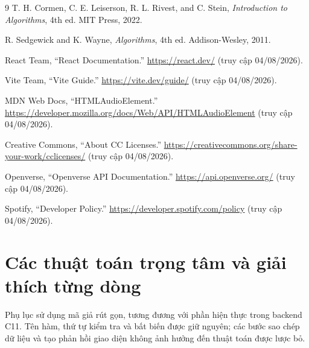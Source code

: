 \documentclass[12pt,a4paper,twoside,openright]{report}
\newcommand{\pagelead}[1]{\noindent\textcolor{hbmuted}{\small #1}}
\begin{document}
\cleardoublepage
{}
{}
{\small
\begin{thebibliography}{9}
T. H. Cormen, C. E. Leiserson, R. L. Rivest, and C. Stein,
\textit{Introduction to Algorithms}, 4th ed. MIT Press, 2022.

R. Sedgewick and K. Wayne, \textit{Algorithms}, 4th ed. Addison-Wesley, 2011.

React Team, ``React Documentation.'' \url{https://react.dev/} (truy cập 04/08/2026).

Vite Team, ``Vite Guide.'' \url{https://vite.dev/guide/} (truy cập 04/08/2026).

MDN Web Docs, ``HTMLAudioElement.''
\url{https://developer.mozilla.org/docs/Web/API/HTMLAudioElement} (truy cập 04/08/2026).

Creative Commons, ``About CC Licenses.''
\url{https://creativecommons.org/share-your-work/cclicenses/} (truy cập 04/08/2026).

Openverse, ``Openverse API Documentation.'' \url{https://api.openverse.org/}
(truy cập 04/08/2026).

Spotify, ``Developer Policy.'' \url{https://developer.spotify.com/policy}
(truy cập 04/08/2026).
\end{thebibliography}
}

\cleardoublepage
\appendix
\chapter{Các thuật toán trọng tâm và giải thích từng dòng}
\pagelead{Phụ lục sử dụng mã giả rút gọn, tương đương với phần hiện thực trong backend C11.
Tên hàm, thứ tự kiểm tra và bất biến
được giữ nguyên; các bước sao chép dữ liệu và tạo phản hồi giao diện không ảnh hưởng đến
thuật toán được lược bỏ.}
\end{document}
